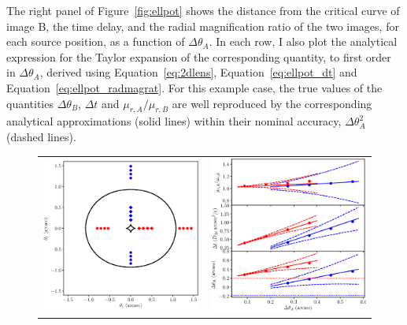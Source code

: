 \documentclass[usenatbib]{mnras}
\def\Fref#1{Figure~\ref{#1}\xspace}
\def\Eref#1{Equation~\ref{#1}\xspace}
\begin{document}
{The right panel of \Fref{fig:ellpot} shows the distance from the critical curve of image B, the time delay, and the radial magnification ratio of the two images, for each source position, as a function of $\Delta\theta_A$.
In each row, I also plot the analytical expression for the Taylor expansion of the corresponding quantity, to first order in $\Delta\theta_A$, derived using \Eref{eq:2dlens}, \Eref{eq:ellpot_dt} and \Eref{eq:ellpot_radmagrat}.
For this example case, the true values of the quantities $\Delta\theta_B$, $\Delta t$ and $\mu_{r,A}/\mu_{r,B}$ are well reproduced by the corresponding analytical approximations (solid lines) within their nominal accuracy, $\Delta\theta_A^2$ (dashed lines).
%
\begin{figure}
 \begin{tabular}{cc}
 \includegraphics[width=\columnwidth]{ellpot_critcurve.eps} &
 \includegraphics[width=\columnwidth]{ellpot_plots.eps}

\end{tabular}
\end{figure}}
\end{document}

